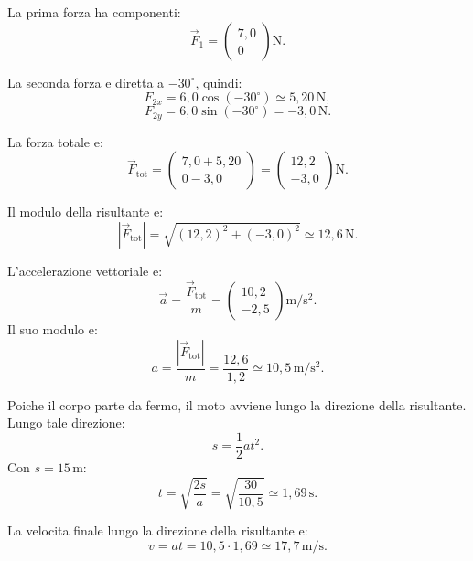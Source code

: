 \begin{soluzione}
La prima forza ha componenti:
\[
\vec F_1=
\begin{pmatrix}
7{,}0\\[4pt]
0
\end{pmatrix}
\mathrm{N}.
\]

La seconda forza e diretta a \(-30^\circ\), quindi:
\[
F_{2x}=6{,}0\cos(-30^\circ)\simeq 5{,}20\,\mathrm{N},
\]
\[
F_{2y}=6{,}0\sin(-30^\circ)=-3{,}0\,\mathrm{N}.
\]

La forza totale e:
\[
\vec F_\text{tot}=
\begin{pmatrix}
7{,}0+5{,}20\\[4pt]
0-3{,}0
\end{pmatrix}
=
\begin{pmatrix}
12{,}2\\[4pt]
-3{,}0
\end{pmatrix}
\mathrm{N}.
\]

Il modulo della risultante e:
\[
|\vec F_\text{tot}|
=\sqrt{(12{,}2)^2+(-3{,}0)^2}
\simeq 12{,}6\,\mathrm{N}.
\]

L'accelerazione vettoriale e:
\[
\vec a=\frac{\vec F_\text{tot}}{m}
=
\begin{pmatrix}
10{,}2\\[4pt]
-2{,}5
\end{pmatrix}
\mathrm{m/s^2}.
\]
Il suo modulo e:
\[
a=\frac{|\vec F_\text{tot}|}{m}
=\frac{12{,}6}{1{,}2}
\simeq 10{,}5\,\mathrm{m/s^2}.
\]

Poiche il corpo parte da fermo, il moto avviene lungo la direzione della
risultante. Lungo tale direzione:
\[
s=\frac{1}{2}at^2.
\]
Con \(s=15\,\mathrm{m}\):
\[
t=\sqrt{\frac{2s}{a}}
=\sqrt{\frac{30}{10{,}5}}
\simeq 1{,}69\,\mathrm{s}.
\]

La velocita finale lungo la direzione della risultante e:
\[
v=at=10{,}5\cdot 1{,}69
\simeq 17{,}7\,\mathrm{m/s}.
\]
\end{soluzione}
